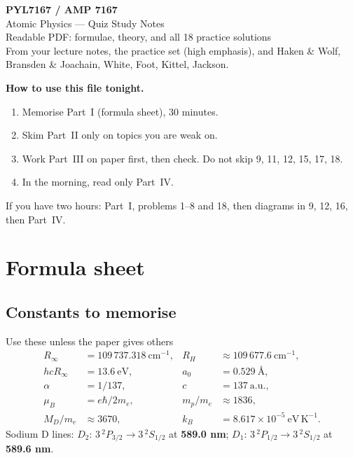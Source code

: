 \documentclass[11pt,a4paper]{article}
\begin{document}
\thispagestyle{plain}

\begin{center}
{\LARGE\bfseries PYL7167 / AMP 7167}\\[4pt]
{\Large Atomic Physics --- Quiz Study Notes}\\[8pt]
{\large Readable PDF: formulae, theory, and all 18 practice solutions}\\[6pt]
\small From your lecture notes, the practice set (high emphasis), and Haken \& Wolf, Bransden \& Joachain, White, Foot, Kittel, Jackson.
\end{center}

\vspace{6pt}
\begin{trapbox}
\textbf{How to use this file tonight.}
\begin{enumerate}
  \item Memorise Part~I (formula sheet), 30 minutes.
  \item Skim Part~II only on topics you are weak on.
  \item Work Part~III on paper first, then check. Do not skip 9, 11, 12, 15, 17, 18.
  \item In the morning, read only Part~IV.
\end{enumerate}
If you have two hours: Part~I, problems 1--8 and 18, then diagrams in 9, 12, 16, then Part~IV.
\end{trapbox}

\tableofcontents
\newpage

\section{Formula sheet}

\subsection*{Constants to memorise}
\begin{keybox}{Use these unless the paper gives others}
\[
\begin{aligned}
R_\infty &= 109\,737.318~\mathrm{cm}^{-1}, &
R_H &\approx 109\,677.6~\mathrm{cm}^{-1},\\
hcR_\infty &= 13.6~\mathrm{eV}, &
a_0 &= 0.529~\text{\AA},\\
\alpha &= 1/137, &
c &= 137~\mathrm{a.u.},\\
\mu_B &= e\hbar/2m_e, &
m_p/m_e &\approx 1836,\\
M_D/m_e &\approx 3670, &
k_B &= 8.617\times 10^{-5}~\mathrm{eV\,K}^{-1}.
\end{aligned}
\]
Sodium D lines: \(D_2\): \(3\,{}^2P_{3/2}\to 3\,{}^2S_{1/2}\) at \textbf{589.0 nm};
\(D_1\): \(3\,{}^2P_{1/2}\to 3\,{}^2S_{1/2}\) at \textbf{589.6 nm}.
\end{keybox}
\end{document}

